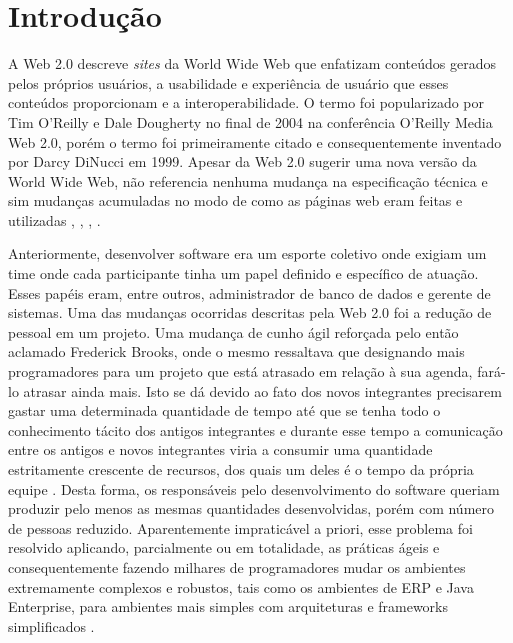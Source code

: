 \chapter{Introdução}

A Web 2.0 descreve \textit{sites} da World Wide Web que enfatizam conteúdos gerados pelos próprios usuários, a usabilidade e experiência de usuário que esses conteúdos proporcionam e a interoperabilidade. O termo foi popularizado por Tim O'Reilly e Dale Dougherty no final de 2004 na conferência O'Reilly Media Web 2.0, porém o termo foi primeiramente citado e consequentemente inventado por Darcy DiNucci em 1999. Apesar da Web 2.0 sugerir uma nova versão da World Wide Web, não referencia nenhuma mudança na especificação técnica e sim mudanças acumuladas no modo de como as páginas web eram feitas e utilizadas \cite{graham2005}, \cite{oreilly2005}, \cite{strickland2007}, \cite{dinucci1999}.

	Anteriormente, desenvolver software era um esporte coletivo onde exigiam um time onde cada participante tinha um papel definido e específico de atuação. Esses papéis eram, entre outros, administrador de banco de dados e gerente de sistemas. Uma das mudanças ocorridas descritas pela Web 2.0 foi a redução de pessoal em um projeto. Uma mudança de cunho ágil reforçada pelo então aclamado Frederick Brooks, onde o mesmo ressaltava que designando mais programadores para um projeto que está atrasado em relação à sua agenda, fará-lo atrasar ainda mais. Isto se dá devido ao fato dos novos integrantes precisarem gastar uma determinada quantidade de tempo até que se tenha todo o conhecimento tácito dos antigos integrantes e durante esse tempo a comunicação entre os antigos e novos integrantes viria a consumir uma quantidade estritamente crescente de recursos, dos quais um deles é o tempo da própria equipe \cite{Brooks:1995:MM:207583}. Desta forma, os responsáveis pelo desenvolvimento do software queriam produzir pelo menos as mesmas quantidades desenvolvidas, porém com número de pessoas reduzido. Aparentemente impraticável a priori, esse problema foi resolvido aplicando, parcialmente ou em totalidade, as práticas ágeis e consequentemente fazendo milhares de programadores mudar os ambientes extremamente complexos e robustos, tais como os ambientes de ERP e Java Enterprise, para ambientes mais simples com arquiteturas e frameworks simplificados \cite{kent1998}.

